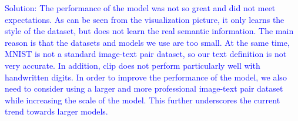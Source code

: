 \documentclass[a4paper]{article}
\begin{document}
\begin{itemize}
    \textcolor{blue}{Solution: The performance of the model was not so great and did not meet expectations. As can be seen from the visualization picture, it only learns the style of the dataset, but does not learn the real semantic information. The main reason is that the datasets and models we use are too small. At the same time, MNIST is not a standard image-text pair dataset, so our text definition is not very accurate. In addition, clip does not perform particularly well with handwritten digits. In order to improve the performance of the model, we also need to consider using a larger and more professional image-text pair dataset while increasing the scale of the model. This further underscores the current trend towards larger models.}
\end{itemize}
\end{document}
